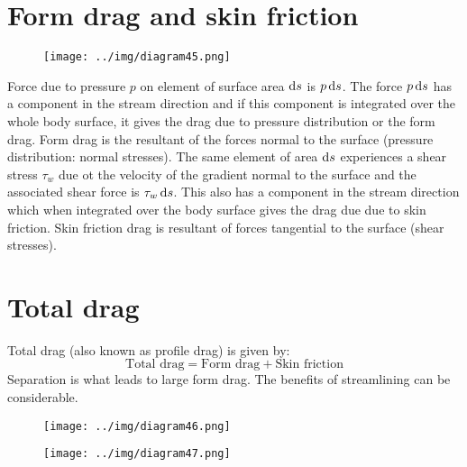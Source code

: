 \documentclass[class=report, crop=false, 12pt,a4paper]{standalone}
\begin{document}
\section{Form drag and skin friction}
\begin{figure}[H]
  \centering
  \texttt{[image: ../img/diagram45.png]}
\end{figure}
Force due to pressure $p$ on element of surface area $\dif s$ is $p \dif s$. The force $p \dif s$ has a component in the stream direction and if this component is integrated over the whole body surface, it gives the drag due to pressure distribution or the form drag. Form drag is the resultant of the forces normal to the surface (pressure distribution: normal stresses). The same element of area $\dif s$ experiences a shear stress $\tau_w$ due ot the velocity of the gradient normal to the surface and the associated shear force is $\tau_w \dif s$. This also has a component in the stream direction which when integrated over the body surface gives the drag due due to skin friction. Skin friction drag is resultant of forces tangential to the surface (shear stresses).
\section{Total drag}
Total drag (also known as profile drag) is given by:
\begin{equation}
  \textrm{Total drag} = \textrm{Form drag} + \textrm{Skin friction}
\end{equation}
Separation is what leads to large form drag. The benefits of streamlining can be considerable.
\begin{figure}[H]
  \centering
  \texttt{[image: ../img/diagram46.png]}
\end{figure} 
\begin{figure}[H]
  \centering
  \texttt{[image: ../img/diagram47.png]}
\end{figure}
\end{document}
